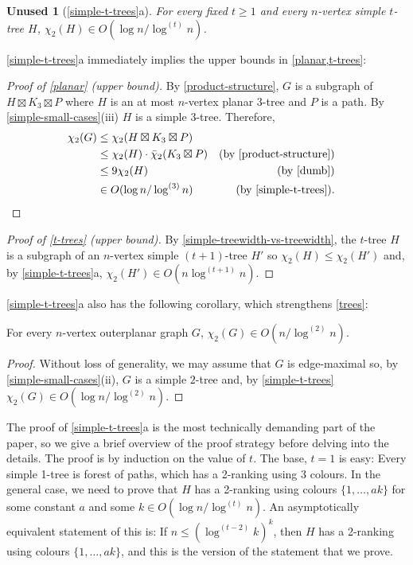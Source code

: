 \documentclass[kpfonts]{patmorin}
\newcommand{\trn}{\chi_2}
\newcommand{\dtcn}{\bar{\chi}_2}
\theoremstyle{named}
\newtheorem*{namedtheorem}{Unused}
\newcommand{\weirdref}[2]{\cref{#1}#2}
\newcommand{\weirdlabel}[2]{\label{#1-#1}}
\begin{document}
\begin{namedtheorem}[\weirdref{simple-t-trees}{a}]\weirdlabel{simple-t-trees}{a}
    For every fixed $t\ge 1$ and every $n$-vertex simple $t$-tree $H$, $\trn(H)\in O(\log n/\log^{(t)} n)$.
\end{namedtheorem}

\weirdref{simple-t-trees}{a} immediately implies the upper bounds in \cref{planar,t-trees}:

\begin{proof}[Proof of \cref{planar} (upper bound)]
    By \cref{product-structure}, $G$ is a subgraph of $H\boxtimes K_3\boxtimes P$ where $H$ is an at most $n$-vertex planar 3-tree and $P$ is a path. By \cref{simple-small-cases}(iii) $H$ is a simple 3-tree. Therefore,
    \begin{align*}
        \trn(G) & \le \trn(H\boxtimes K_3\boxtimes P) \\
                & \le \trn(H)\cdot \dtcn(K_3\boxtimes P)
                    & \text{(by \cref{product-structure})}\\
                & \le 9\trn(H) & \text{(by \cref{dumb})} \\
                & \in O(\log n/\log^{(3)} n) & \text{(by \cref{simple-t-trees}).} & \qedhere
    \end{align*}
\end{proof}

\begin{proof}[Proof of \cref{t-trees} (upper bound)]
    By \cref{simple-treewidth-vs-treewidth}, the $t$-tree $H$ is a subgraph of an $n$-vertex simple $(t+1)$-tree $H'$ so $\trn(H)\le \trn(H')$ and, by   \weirdref{simple-t-trees}{a}, $\trn(H')\in O(n\log^{(t+1)}n)$.
\end{proof}

\weirdref{simple-t-trees}{a} also has the following corollary, which strengthens \cref{trees}:

\begin{cor}\label{outerplanar}
    For every $n$-vertex outerplanar graph $G$, $\trn(G)\in O(n/\log^{(2)} n)$.
\end{cor}

\begin{proof}
    Without loss of generality, we may assume that $G$ is edge-maximal so, by \cref{simple-small-cases}{(ii)}, $G$ is a simple $2$-tree and, by \cref{simple-t-trees} $\trn(G)\in O(\log n/\log^{(2)} n)$.
\end{proof}


The proof of \weirdref{simple-t-trees}{a} is the most technically demanding part of the paper, so we give a brief overview of the proof strategy before delving into the details.  The proof is by induction on the value of $t$.  The base, $t=1$ is easy: Every simple 1-tree is forest of paths, which has a 2-ranking using 3 colours.  In the general case, we need to prove that $H$ has a 2-ranking using colours $\{1,\ldots,ak\}$ for some constant $a$ and some $k\in O(\log n/\log^{(t)} n)$.  An asymptotically equivalent statement of this is: If $n \le (\log^{(t-2)}k)^k$, then $H$ has a 2-ranking using colours $\{1,\ldots,ak\}$, and this is the version of the statement that we prove.
\end{document}
